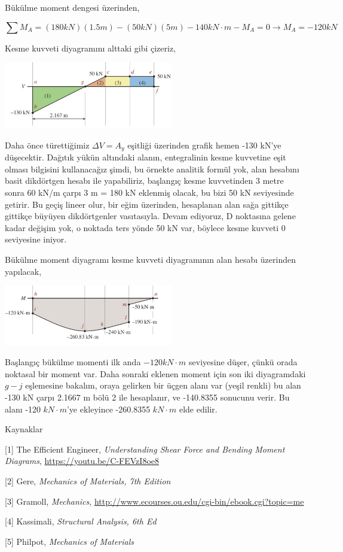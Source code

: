 \documentclass[12pt,fleqn]{article}\usepackage{../../common}
\begin{document}
Bükülme moment dengesi üzerinden,

$$
\sum M_A = (180 kN)(1.5 m) - (50 kN)(5 m) - 140 kN \cdot m - M_A = 0 \to M_A =
-120 kN
$$

Kesme kuvveti diyagramını alttaki gibi çizeriz,

\includegraphics[width=20em]{phy_020_strs_02_21.jpg}

Daha önce türettiğimiz $\Delta V = A_y$ eşitliği üzerinden grafik hemen -130
kN'ye düşecektir. Dağıtık yükün altındaki alanın, entegralinin kesme kuvvetine
eşit olması bilgisini kullanacağız şimdi, bu örnekte analitik formül yok, alan
hesabını basit dikdörtgen hesabı ile yapabiliriz, başlangıç kesme kuvvetinden 3
metre sonra 60 kN/m çarpı 3 m = 180 kN eklenmiş olacak, bu bizi 50 kN
seviyesinde getirir. Bu geçiş lineer olur, bir eğim üzerinden, hesaplanan alan
sağa gittikçe gittikçe büyüyen dikdörtgenler vasıtasıyla.  Devam ediyoruz, D
noktasına gelene kadar değişim yok, o noktada ters yönde 50 kN var, böylece
kesme kuvveti 0 seviyesine iniyor.

Bükülme moment diyagramı kesme kuvveti diyagramının alan hesabı üzerinden
yapılacak,

\includegraphics[width=20em]{phy_020_strs_02_22.jpg}

Başlangıç bükülme momenti ilk anda $-120 kN \cdot m$ seviyesine düşer, çünkü
orada noktasal bir moment var. Daha sonraki eklenen moment için son iki
diyagramdaki $g-j$ eşlemesine bakalım, oraya gelirken bir üçgen alanı var (yeşil
renkli) bu alan -130 kN çarpı 2.1667 m bölü 2 ile hesaplanır, ve -140.8355
sonucunu verir. Bu alanı -120 $kN \cdot m$'ye ekleyince -260.8355 $kN \cdot m$
elde edilir.


Kaynaklar 

[1] The Efficient Engineer, {\em Understanding Shear Force and Bending Moment Diagrams},
    \url{https://youtu.be/C-FEVzI8oe8}

[2] Gere, {\em Mechanics of Materials, 7th Edition}

[3] Gramoll, {\em Mechanics},
    \url{http://www.ecourses.ou.edu/cgi-bin/ebook.cgi?topic=me}

[4] Kassimali, {\em Structural Analysis, 6th Ed}

[5] Philpot, {\em Mechanics of Materials}
    
\end{document}
